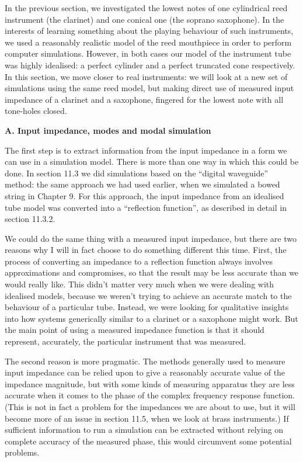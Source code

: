 

  In the previous section, we investigated the lowest notes of one cylindrical 
  reed instrument (the clarinet) and one conical one (the soprano saxophone). 
  In the interests of learning something about the playing behaviour of such 
  instruments, we used a reasonably realistic model of the reed mouthpiece in 
  order to perform computer simulations. However, in both cases our model of 
  the instrument tube was highly idealised: a perfect cylinder and a perfect 
  truncated cone respectively. In this section, we move closer to real 
  instruments: we will look at a new set of simulations using the same reed 
  model, but making direct use of measured input impedance of a clarinet and a 
  saxophone, fingered for the lowest note with all tone-holes closed. 

  \textbf{A. Input impedance, modes and modal simulation} 

  The first step is to extract information from the input impedance in a form 
  we can use in a simulation model. There is more than one way in which this 
  could be done. In section 11.3 we did simulations based on the “digital 
  waveguide” method: the same approach we had used earlier, when we simulated a 
  bowed string in Chapter 9. For this approach, the input impedance from an 
  idealised tube model was converted into a “reflection function”, as described 
  in detail in section 11.3.2. 

  We could do the same thing with a measured input impedance, but there are two 
  reasons why I will in fact choose to do something different this time. First, 
  the process of converting an impedance to a reflection function always 
  involves approximations and compromises, so that the result may be less 
  accurate than we would really like. This didn’t matter very much when we were 
  dealing with idealised models, because we weren’t trying to achieve an 
  accurate match to the behaviour of a particular tube. Instead, we were 
  looking for qualitative insights into how systems generically similar to a 
  clarinet or a saxophone might work. But the main point of using a measured 
  impedance function is that it should represent, accurately, the particular 
  instrument that was measured. 

  The second reason is more pragmatic. The methods generally used to measure 
  input impedance can be relied upon to give a reasonably accurate value of the 
  impedance magnitude, but with some kinds of measuring apparatus they are less 
  accurate when it comes to the phase of the complex frequency response 
  function. (This is not in fact a problem for the impedances we are about to 
  use, but it will become more of an issue in section 11.5, when we look at 
  brass instruments.) If sufficient information to run a simulation can be 
  extracted without relying on complete accuracy of the measured phase, this 
  would circumvent some potential problems. 


